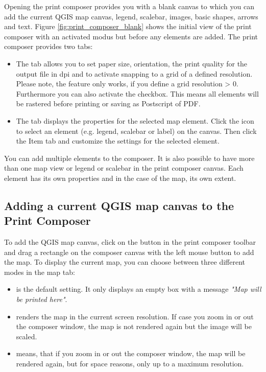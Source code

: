Opening the print composer provides you with a blank canvas to which you can 
add the current QGIS map canvas, legend, scalebar, images, basic shapes,
arrows and text. Figure \ref{fig:print_composer_blank} shows the initial view
of the print composer with an activated  modus but
before any elements are added. The print composer provides two tabs:

\begin{itemize}
\item The  tab allows you to set paper size, orientation, the
print quality for the output file in dpi and to activate snapping to a grid
of a defined resolution. Please note, the  feature
only works, if you define a grid resolution > 0. Furthermore you can also
activate the  checkbox. This means all elements
will be rastered before printing or saving as Postscript of PDF.
\item The  tab displays the properties for the selected map element. 
Click the  
icon to select an element (e.g. legend, scalebar or label) on the canvas. 
Then click the Item tab and customize the settings for the selected 
element.
\end{itemize}

You can add multiple elements to the composer. It is also possible to have 
more than one map view or legend or scalebar in the print composer canvas. 
Each element has its own properties and in the case of the map, its own 
extent.

\subsection{Adding a current QGIS map canvas to the Print Composer}

To add the QGIS map canvas, click on the  button in the print composer toolbar and drag a 
rectangle on the composer canvas with the left mouse button to add the map. 
To display the current map, you can choose between three different modes in
the map  tab:

\begin{itemize}
\item {} is the default setting. It only
displays an empty box with a message \textit{"Map will be printed here"}. 
\item {} renders the map in the current screen
resolution. If case you zoom in or out the composer window, the map is not
rendered again but the image will be scaled.
\item {} means, that if you zoom in or out the
composer window, the map will be rendered again, but for space reasons, only
up to a maximum resolution.
\end{itemize}

